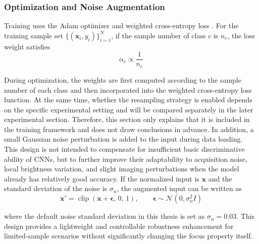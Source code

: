 \subsubsection{Optimization and Noise Augmentation}
\par Training uses the Adam optimizer and weighted cross-entropy loss
\cite{kingma2014adam,Cui_2019_CVPR}. For the training sample set
$\{(\mathbf{x}_i,y_i)\}_{i=1}^{N}$, if the sample number of class $c$ is $n_c$,
the loss weight satisfies
\begin{equation}
    \alpha_c \propto \frac{1}{n_c}
    \label{eq:cnn-class-weight-method}
\end{equation}
\par During optimization, the weights are first computed according to the sample
number of each class and then incorporated into the weighted cross-entropy loss
function. At the same time, whether the resampling strategy is enabled depends
on the specific experimental setting and will be compared separately in the
later experimental section. Therefore, this section only explains that it is
included in the training framework and does not draw conclusions in advance. In
addition, a small Gaussian noise perturbation is added to the input during data
loading. This design is not intended to compensate for insufficient basic
discriminative ability of CNNs, but to further improve their adaptability to
acquisition noise, local brightness variation, and slight imaging perturbations
when the model already has relatively good accuracy. If the normalized input is
$\mathbf{x}$ and the standard deviation of the noise is $\sigma_n$, the
augmented input can be written as
\begin{equation}
    \mathbf{x}'=\operatorname{clip}\!\left(\mathbf{x}+\boldsymbol{\epsilon},\,0,\,1\right),\qquad
    \boldsymbol{\epsilon}\sim\mathcal{N}(0,\sigma_n^2 I)
    \label{eq:cnn-noise-method}
\end{equation}
\par where the default noise standard deviation in this thesis is set as
$\sigma_n=0.03$. This design provides a lightweight and controllable robustness
enhancement for limited-sample scenarios without significantly changing the
focus property itself.

